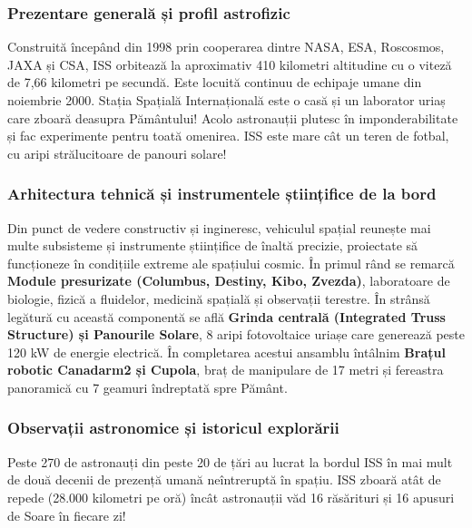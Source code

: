 \subsubsection*{Prezentare generală și profil astrofizic}
Construită începând din 1998 prin cooperarea dintre NASA, ESA, Roscosmos, JAXA și CSA, ISS orbitează la aproximativ 410 kilometri altitudine cu o viteză de 7,66 kilometri pe secundă. Este locuită continuu de echipaje umane din noiembrie 2000. Stația Spațială Internațională este o casă și un laborator uriaș care zboară deasupra Pământului! Acolo astronauții plutesc în imponderabilitate și fac experimente pentru toată omenirea. ISS este mare cât un teren de fotbal, cu aripi strălucitoare de panouri solare!

\subsubsection*{Arhitectura tehnică și instrumentele științifice de la bord}
Din punct de vedere constructiv și ingineresc, vehiculul spațial reunește mai multe subsisteme și instrumente științifice de înaltă precizie, proiectate să funcționeze în condițiile extreme ale spațiului cosmic. În primul rând se remarcă \textbf{Module presurizate (Columbus, Destiny, Kibo, Zvezda)}, laboratoare de biologie, fizică a fluidelor, medicină spațială și observații terestre. În strânsă legătură cu această componentă se află \textbf{Grinda centrală (Integrated Truss Structure) și Panourile Solare}, 8 aripi fotovoltaice uriașe care generează peste 120 kW de energie electrică. În completarea acestui ansamblu întâlnim \textbf{Brațul robotic Canadarm2 și Cupola}, braț de manipulare de 17 metri și fereastra panoramică cu 7 geamuri îndreptată spre Pământ.

\subsubsection*{Observații astronomice și istoricul explorării}
Peste 270 de astronauți din peste 20 de țări au lucrat la bordul ISS în mai mult de două decenii de prezență umană neîntreruptă în spațiu. ISS zboară atât de repede (28.000 kilometri pe oră) încât astronauții văd 16 răsărituri și 16 apusuri de Soare în fiecare zi!

